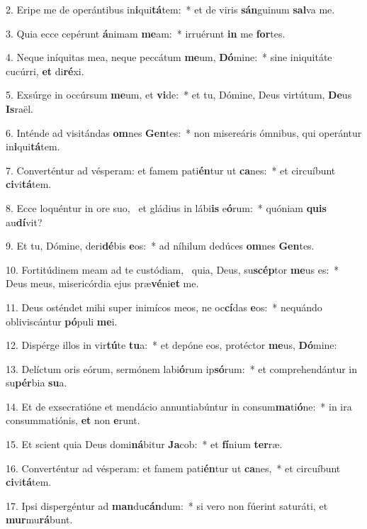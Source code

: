 2. Eripe me de operántibus in\textbf{i}qui\textbf{tá}tem:~*  et de viris \textbf{sán}guinum \textbf{sal}va me.\

3. Quia ecce cepérunt \textbf{á}nimam \textbf{me}am:~*  irruérunt \textbf{in} me \textbf{for}tes.\

4. Neque iníquitas mea, neque peccátum \textbf{me}um, \textbf{Dó}mine:~*  sine iniquitáte cucúrri, \textbf{et} di\textbf{ré}xi.\

5. Exsúrge in occúrsum \textbf{me}um, et \textbf{vi}de:~*  et tu, Dómine, Deus virtútum, \textbf{De}us \textbf{Is}raël.\

6. Inténde ad visitándas \textbf{om}nes \textbf{Gen}tes:~*  non misereáris ómnibus, qui operántur in\textbf{i}qui\textbf{tá}tem.\

7. Converténtur ad vésperam: et famem pati\textbf{én}tur ut \textbf{ca}nes:~*  et circuíbunt \textbf{ci}vi\textbf{tá}tem.\

8. Ecce loquéntur in ore suo, \dag\  et gládius in lábi\textbf{is} e\textbf{ó}rum:~*  quóniam \textbf{quis} au\textbf{dí}vit?\

9. Et tu, Dómine, deri\textbf{dé}bis \textbf{e}os:~*  ad níhilum dedúces \textbf{om}nes \textbf{Gen}tes.\

10. Fortitúdinem meam ad te custódiam, \dag\  quia, Deus, su\textbf{scép}tor \textbf{me}us es:~*  Deus meus, misericórdia ejus præ\textbf{vé}ni\textbf{et} me.\

11. Deus osténdet mihi super inimícos meos, ne oc\textbf{cí}das \textbf{e}os:~*  nequándo obliviscántur \textbf{pó}puli \textbf{me}i.\

12. Dispérge illos in vir\textbf{tú}te \textbf{tu}a:~*  et depóne eos, protéctor \textbf{me}us, \textbf{Dó}mine:\

13. Delíctum oris eórum, sermónem labi\textbf{ó}rum ip\textbf{só}rum:~*  et comprehendántur in su\textbf{pér}bia \textbf{su}a.\

14. Et de exsecratióne et mendácio annuntiabúntur in consum\textbf{ma}ti\textbf{ó}ne:~*  in ira consummatiónis, \textbf{et} non \textbf{e}runt.\

15. Et scient quia Deus domi\textbf{ná}bitur \textbf{Ja}cob:~*  et \textbf{fí}nium \textbf{ter}ræ.\

16. Converténtur ad vésperam: et famem pati\textbf{én}tur ut \textbf{ca}nes,~*  et circuíbunt \textbf{ci}vi\textbf{tá}tem.\

17. Ipsi dispergéntur ad \textbf{man}du\textbf{cán}dum:~*  si vero non fúerint saturáti, et \textbf{mur}mu\textbf{rá}bunt.\

